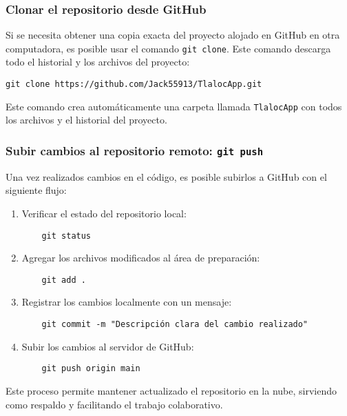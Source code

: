 \subsubsection*{Clonar el repositorio desde GitHub}

Si se necesita obtener una copia exacta del proyecto alojado en GitHub en otra computadora, es posible usar el comando \texttt{git clone}. Este comando descarga todo el historial y los archivos del proyecto:

\begin{verbatim}
git clone https://github.com/Jack55913/TlalocApp.git
\end{verbatim}

Este comando crea automáticamente una carpeta llamada \texttt{TlalocApp} con todos los archivos y el historial del proyecto.

\subsubsection*{Subir cambios al repositorio remoto: \texttt{git push}}

Una vez realizados cambios en el código, es posible subirlos a GitHub con el siguiente flujo:

\begin{enumerate}
    \item Verificar el estado del repositorio local:
    \begin{verbatim}
    git status
    \end{verbatim}
    
    \item Agregar los archivos modificados al área de preparación:
    \begin{verbatim}
    git add .
    \end{verbatim}
    
    \item Registrar los cambios localmente con un mensaje:
    \begin{verbatim}
    git commit -m "Descripción clara del cambio realizado"
    \end{verbatim}
    
    \item Subir los cambios al servidor de GitHub:
    \begin{verbatim}
    git push origin main
    \end{verbatim}
\end{enumerate}

Este proceso permite mantener actualizado el repositorio en la nube, sirviendo como respaldo y facilitando el trabajo colaborativo.

